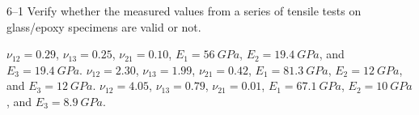 
\begin{problem}{6--1}
  Verify whether the measured values from a series of tensile tests on glass/epoxy specimens are valid or not.

  \begin{subproblems}
    \subproblem \(\nu_{12} = 0.29\), \(\nu_{13} = 0.25\), \(\nu_{21} = 0.10\), \(E_1 = \qty{56}{GPa}\), \(E_2 = \qty{19.4}{GPa}\), and \(E_3 = \qty{19.4}{GPa}\).
    \subproblem \(\nu_{12} = 2.30\), \(\nu_{13} = 1.99\), \(\nu_{21} = 0.42\), \(E_1 = \qty{81.3}{GPa}\), \(E_2 = \qty{12}{GPa}\), and \(E_3 = \qty{12}{GPa}\).
    \subproblem \(\nu_{12} = 4.05\), \(\nu_{13} = 0.79\), \(\nu_{21} = 0.01\), \(E_1 = \qty{67.1}{GPa}\), \(E_2 = \qty{10}{GPa}\), and \(E_3 = \qty{8.9}{GPa}\).
  \end{subproblems}
\end{problem}

